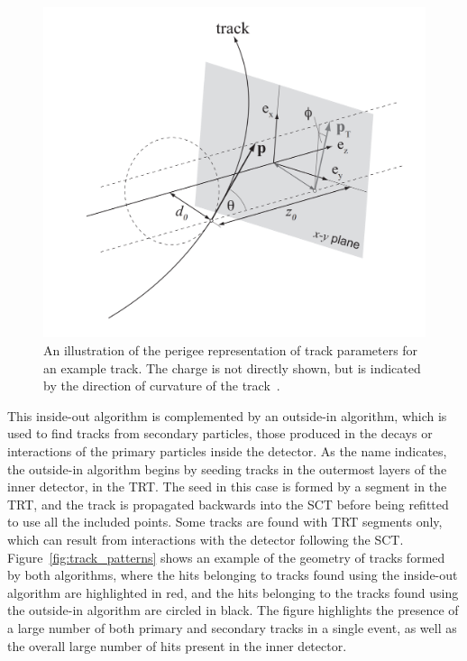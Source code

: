 \begin{figure}
\includegraphics[width=\fullfig]{figures/perigee_rep.png}
\caption{An illustration of the perigee representation of track parameters for an example track. The charge is not directly shown, but is indicated by the direction of curvature of the track~\cite{atlas_extrapolation}.}
\label{fig:perigee_rep}
\end{figure}

This inside-out algorithm is complemented by an outside-in algorithm, which is used to find tracks from secondary particles, those produced in the decays or interactions of the primary particles inside the detector. 
As the name indicates, the outside-in algorithm begins by seeding tracks in the outermost layers of the inner detector, in the \ac{TRT}. 
The seed in this case is formed by a segment in the \ac{TRT}, and the track is propagated backwards into the \ac{SCT} before being refitted to use all the included points.
Some tracks are found with \ac{TRT} segments only, which can result from interactions with the detector following the \ac{SCT}.
Figure~\ref{fig:track_patterns} shows an example of the geometry of tracks formed by both algorithms, where the hits belonging to tracks found using the inside-out algorithm are highlighted in red, and the hits belonging to the tracks found using the outside-in algorithm are circled in black.
The figure highlights the presence of a large number of both primary and secondary tracks in a single event, as well as the overall large number of hits present in the inner detector.


